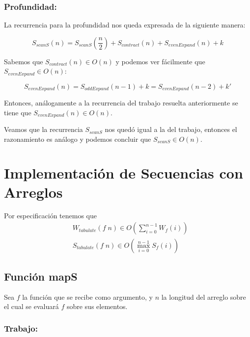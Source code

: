 \documentclass[11pt]{article}
\begin{document}
\subsubsection{Profundidad:}

La recurrencia para la profundidad nos queda expresada de la siguiente manera:

\begin{equation*}
    S_{scanS}(n) = S_{scanS}(\frac{n}{2}) + S_{contract}(n) + S_{evenExpand}(n) + k 
\end{equation*}

Sabemos que $S_{contract}(n) \in O(n)$ y podemos ver fácilmente que $S_{evenExpand} \in O(n)$:

\begin{equation*}
    S_{evenExpand}(n) = S_{oddExpand}(n - 1) + k = S_{evenExpand}(n - 2) + k'
\end{equation*}

Entonces, análogamente a la recurrencia del trabajo resuelta anteriormente se tiene
que $S_{evenExpand}(n) \in O(n)$.


Veamos que la recurrencia $S_{scanS}$ nos quedó igual a la del trabajo, entonces el
razonamiento es análogo y podemos concluir que $S_{scanS} \in O(n)$.


\section{Implementación de Secuencias con Arreglos}

Por especificación tenemos que
\begin{align*}
& W_{tabulate}(f \; n) \in O\left(\displaystyle\sum_{i=0}^{n - 1}W_f(i)\right) \\
& S_{tabulate}(f \; n) \in O\left(\displaystyle\max_{i=0}^{n - 1}S_f(i)\right)
\end{align*}

\subsection{Función mapS}

Sea $f$ la función que se recibe como argumento, y $n$ la longitud del arreglo
sobre el cual se evaluará $f$ sobre sus elementos.
\subsubsection{Trabajo:}
 
\end{document}

